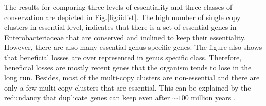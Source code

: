 \documentclass[12pt,letterpaper]{article}
\begin{document}
The results for comparing three levels of essentiality and three classes of conservation are depicted in Fig.\@ \ref{fig:iidist}. The high number of single copy clusters in essential level, indicates that there is a set of essential genes in Enterobacteriaceae that are conserved and inclined to keep their essentiality. However, there are also many essential genus specific genes. The figure also shows that beneficial losses are over represented in genus specific class. Therefore, beneficial losses are mostly recent genes that the organism tends to lose in the long run. Besides, most of the multi-copy clusters are non-essential and there are only a few multi-copy clusters that are essential. This can be explained by the redundancy that duplicate genes can keep even after $\sim100$ million years \cite{dean_pervasive_2008}. 
\end{document}
